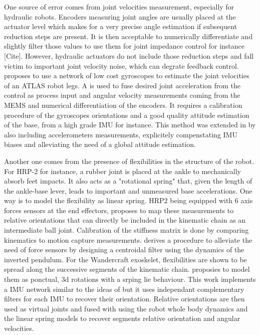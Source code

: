 One source of error comes from joint velocities measurement, especially for hydraulic robots. Encoders measuring joint angles are usually placed 
at the actuator level which makes for a very precise angle estimation if subsequent reduction steps are present. It is then acceptable to numerically 
differentiate and slightly filter those values to use them for joint impedance control for instance [Cite]. However, hydraulic
actuators do not include those reduction steps and fall victim to important joint velocity noise, which can degrate feedback control.
\cite{xinjilefu2016distributed} proposes to use a network of low cost gyroscopes to estimate the joint velocities of an ATLAS robot legs. A \KalmanF
is used to fuse desired joint acceleration from the control as process input and angular velocity measurements coming from the MEMS and numerical
differentiation of the encoders. It requires a calibration procedure of the gyroscopes orientations and a good quality attitude
estimation of the base, from a high grade IMU for instance. This method was extended in \cite{rotella2016imu} by also including
accelerometers measurements, explicitely compenstating IMU biases and alleviating the need of a global attitude estimation.

Another one comes from the presence of flexibilities in the structure of the robot. For HRP-2 for instance, a rubber joint is placed 
at the ankle to mechanically absorb feet impacts. It also acts as a "rotational spring" that, given the length of the ankle-base lever, 
leads to important and unmeasured base accelerations. One way is to model the flexibility as linear spring. HRP2 being equipped with 6 axis 
forces sensors at the end effectors, \cite{flayols2017experimental} proposes to map these measurements to relative orientations that can 
directly be included in the kinematic chain as an intermediate ball joint. Calibration of the stiffness matrix is done by comparing 
kinematics to motion capture measurements. \cite{benallegue2015estimation} derives a procedure to alleviate the need of force sensors by 
designing a centroidal filter using the dynamics of the inverted pendulum. For the Wandercraft exoskelet, flexibilities
are shown to be spread along the successive segments of the kinematic chain. \cite{vigne2018estimation} proposies to model them as ponctual, 
3d rotations with a srping lie behaviour. This work implements a IMU network similar to the ideas of \cite{xinjilefu2016distributed,rotella2016imu} 
but it uses independant complementary filters for each IMU to recover their orientation. Relative orientations are then used as 
virtual joints and fused with using the robot whole body dynamics and the linear spring models to recover segments relative orientation and angular velocities.

